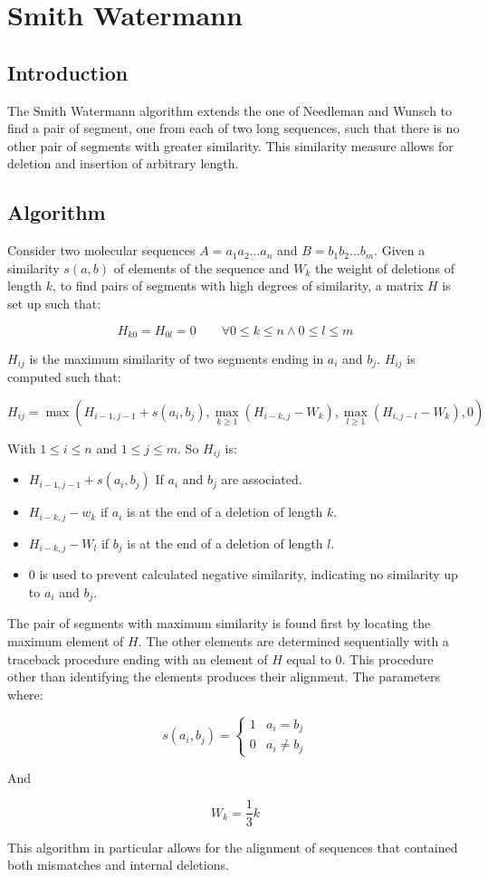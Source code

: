 \chapter{Smith Watermann}

\section{Introduction}
The Smith Watermann algorithm extends the one of Needleman and Wunsch to find a pair of segment, one from each of two long sequences, such that there is no other pair of segments with greater similarity.
This similarity measure allows for deletion and insertion of arbitrary length.

\section{Algorithm}
Consider two molecular sequences $A = a_1a_2\dots a_n$ and $B = b_1b_2\dots b_m$.
Given a similarity $s(a,b)$ of elements of the sequence and $W_k$ the weight of deletions of length $k$, to find pairs of segments with high degrees of similarity, a matrix $H$ is set up such that:

$$H_{k0} = H_{0l} = 0\qquad \forall 0\le k\le n\land 0\le l\le m$$

$H_{ij}$ is the maximum similarity of two segments ending in $a_i$ and $b_j$.
$H_{ij}$ is computed such that:

$$H_{ij} = \max(H_{i-1, j-1} + s(a_i, b_j), \max\limits_{k\ge 1}(H_{i-k, j}-W_k), \max\limits_{l\ge 1}(H_{i, j-l}-W_k), 0)$$

With $1\le i\le n$ and $1\le j\le m$.
So $H_{ij}$ is:

\begin{multicols}{2}
	\begin{itemize}
		\item $H_{i-1, j-1} + s(a_i, b_j)$ If $a_i$ and $b_j$ are associated.
		\item $H_{i-k, j}-w_k$ if $a_i$ is at the end of a deletion of length $k$.
		\item $H_{i-k, j}-W_l$ if $b_j$ is at the end of a deletion of length $l$.
		\item $0$ is used to prevent calculated negative similarity, indicating no similarity up to $a_i$ and $b_j$.
	\end{itemize}
\end{multicols}

The pair of segments with maximum similarity is found first by locating the maximum element of $H$.
The other elements are determined sequentially with a traceback procedure ending with an element of $H$ equal to $0$.
This procedure other than identifying the elements produces their alignment.
The parameters  where:

$$s(a_i, b_j) = \begin{cases} 1 & a_i = b_j \\ 0 & a_i\neq b_j\end{cases}$$

And

$$W_k = \frac{1}{3}k$$

This algorithm in particular allows for the alignment of sequences that contained both mismatches and internal deletions.
